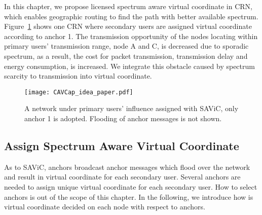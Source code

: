In this chapter, we propose licensed spectrum aware virtual coordinate in CRN, which enables geographic routing to find the path with better available spectrum.
Figure~\ref{fig:SA-VCapidea} shows one CRN where secondary users are assigned virtual coordinate according to anchor 1.
The transmission opportunity of the nodes locating within primary users' transmission range, \eg node A and C, is decreased due to sporadic spectrum, as a result, the cost for packet transmission, \eg transmission delay and energy consumption, is increased.
We integrate this obstacle caused by spectrum scarcity to transmission into virtual coordinate.


\begin{figure}
\centering
\texttt{[image: CAVCap\_idea\_paper.pdf]}
\caption{A network under primary users' influence assigned with SAViC, only anchor 1 is adopted. Flooding of anchor messages is not shown.}
\label{fig:SA-VCapidea}
\end{figure}


\subsection{Assign Spectrum Aware Virtual Coordinate}

As to SAViC, anchors broadcast anchor messages which flood over the network and result in virtual coordinate for each secondary user.
Several anchors are needed to assign unique virtual coordinate for each secondary user.
How to select anchors is out of the scope of this chapter.
In the following, we introduce how is virtual coordinate decided on each node with respect to anchors.


